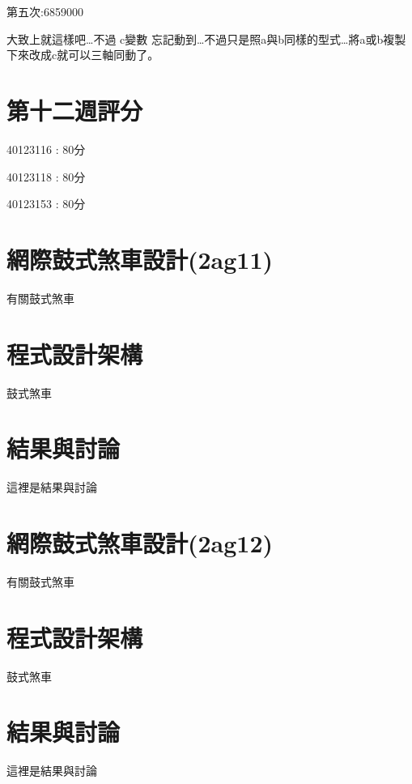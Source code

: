 \documentclass[]{article}
\begin{document}
第五次:6859000

大致上就這樣吧\ldots{}不過 c變數
忘記動到\ldots{}不過只是照a與b同樣的型式\ldots{}將a或b複製下來改成c就可以三軸同動了。

\section{第十二週評分}\label{ux7b2cux5341ux4e8cux9031ux8a55ux5206}

40123116 : 80分

40123118 : 80分

40123153 : 80分

\section{網際鼓式煞車設計(2ag11)}\label{ux7db2ux969bux9f13ux5f0fux715eux8ecaux8a2dux8a082ag11}

有關鼓式煞車

\section{程式設計架構}\label{ux7a0bux5f0fux8a2dux8a08ux67b6ux69cb-6}

鼓式煞車

\section{結果與討論}\label{ux7d50ux679cux8207ux8a0eux8ad6-6}

這裡是結果與討論

\section{網際鼓式煞車設計(2ag12)}\label{ux7db2ux969bux9f13ux5f0fux715eux8ecaux8a2dux8a082ag12}

有關鼓式煞車

\section{程式設計架構}\label{ux7a0bux5f0fux8a2dux8a08ux67b6ux69cb-7}

鼓式煞車

\section{結果與討論}\label{ux7d50ux679cux8207ux8a0eux8ad6-7}

這裡是結果與討論
\end{document}
